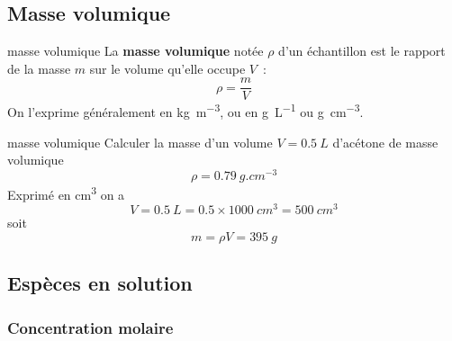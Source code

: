 \documentclass[../main/main.tex]{subfiles}
\begin{document}
\vspace{-15pt}
\subsection{Masse volumique}
\begin{tcbraster}[raster columns=2, raster equal height=rows]
    \begin{defi}[label=defi:massevol]{masse volumique}
        La \textbf{masse volumique} notée $\rho$ d'un échantillon est le rapport
        de la masse $m$ sur le volume qu'elle occupe $V$~:
        \[\boxed{\rho = \frac{m}{V}}\]
        On l'exprime généralement en \si{kg.m^{-3}}, ou en \si{g.L^{-1}} ou
        \si{g.cm^{-3}}.
    \end{defi}
    \begin{exem}[label=exem:massvol]{masse volumique}
        Calculer la masse d'un volume $V = \SI{0.5}{L}$ d'acétone de masse volumique
        \[\rho = \SI{0.79}{g.cm^{-3}}\]
        \tcblower
        {\color{lightgray!10}
        Exprimé en \si{cm^3} on a
        \[V = \SI{0.5}{L} = \num{0.5}\times \SI{1000}{cm^3} = \SI{500}{cm^3}\]
        soit
        \[\boxed{m = \rho V = \SI{395}{g}}\]
        \vspace{-12pt}}
    \end{exem}
\end{tcbraster}

\vspace{-15pt}
\subsection{Espèces en solution}
\subsubsection{Concentration molaire}
\end{document}
